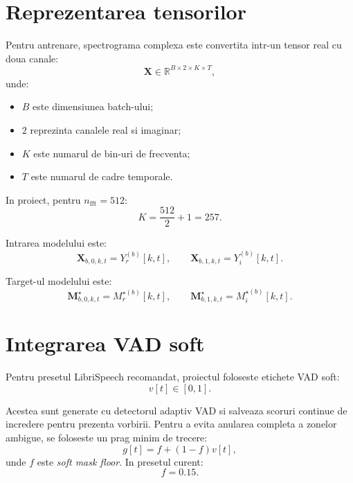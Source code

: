 \documentclass[12pt,a4paper]{article}
\begin{document}
\section{Reprezentarea tensorilor}

Pentru antrenare, spectrograma complexa este convertita intr-un tensor real cu
doua canale:
\begin{equation}
    \bm{X} \in \mathbb{R}^{B \times 2 \times K \times T},
\end{equation}
unde:
\begin{itemize}
    \item $B$ este dimensiunea batch-ului;
    \item $2$ reprezinta canalele real si imaginar;
    \item $K$ este numarul de bin-uri de frecventa;
    \item $T$ este numarul de cadre temporale.
\end{itemize}

In proiect, pentru $n_{\mathrm{fft}}=512$:
\begin{equation}
    K = \frac{512}{2} + 1 = 257.
\end{equation}

Intrarea modelului este:
\begin{equation}
    \bm{X}_{b,0,k,t} = Y_r^{(b)}[k,t],
    \qquad
    \bm{X}_{b,1,k,t} = Y_i^{(b)}[k,t].
\end{equation}

Target-ul modelului este:
\begin{equation}
    \bm{M}^{\star}_{b,0,k,t} = M_r^{\star (b)}[k,t],
    \qquad
    \bm{M}^{\star}_{b,1,k,t} = M_i^{\star (b)}[k,t].
\end{equation}

\section{Integrarea VAD soft}

Pentru presetul LibriSpeech recomandat, proiectul foloseste etichete VAD soft:
\begin{equation}
    v[t] \in [0,1].
\end{equation}

Acestea sunt generate cu detectorul adaptiv VAD si salveaza scoruri continue de
incredere pentru prezenta vorbirii. Pentru a evita anularea completa a zonelor
ambigue, se foloseste un prag minim de trecere:
\begin{equation}
    g[t] = f + (1-f)v[t],
\end{equation}
unde $f$ este \textit{soft mask floor}. In presetul curent:
\begin{equation}
    f = 0.15.
\end{equation}
\end{document}
